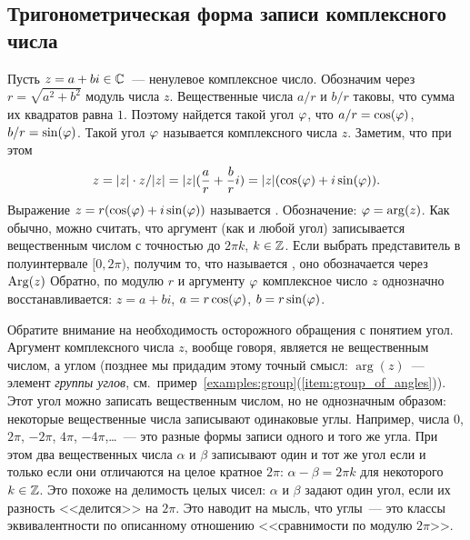 
\subsection{Тригонометрическая форма записи комплексного числа}


\begin{definition}\label{dfn:trigonometric_form}
Пусть $z=a+bi\in\mathbb C$~--- ненулевое комплексное число. Обозначим
через $r=\sqrt{a^2+b^2}$ модуль числа $z$. Вещественные
числа $a/r$ и
$b/r$ таковы, что сумма их квадратов равна $1$. Поэтому
найдется такой угол $\varphi$, что $a/r=\cos(\varphi)$,
$b/r=\sin(\varphi)$. Такой угол $\varphi$ называется
комплексного числа $z$. Заметим, что при этом
$$
z=|z|\cdot z/|z|=|z|(\frac{a}{r}+\frac{b}{r}i)=|z|(\cos(\varphi)+i\sin(\varphi)).
$$
Выражение $z=r(\cos(\varphi)+i\sin(\varphi))$ называется
. Обозначение: $\varphi=\arg(z)$. Как обычно,
можно считать, что аргумент (как и любой угол) записывается
вещественным числом с точностью до $2\pi k$, $k\in\mathbb Z$. Если выбрать
представитель в полуинтервале $[0,2\pi)$, получим то, что называется
, оно обозначается через $\operatorname{Arg}(z)$
Обратно, по
модулю $r$ и аргументу $\varphi$ комплексное число $z$ однозначно
восстанавливается: $z=a+bi$, $a=r\cos(\varphi)$, $b=r\sin(\varphi)$.
\end{definition}

{\small
Обратите внимание на необходимость осторожного обращения с понятием
угол. Аргумент комплексного числа $z$, вообще говоря, является не
вещественным числом, а углом (позднее мы придадим этому точный смысл:
$\arg(z)$~--- элемент {\it группы углов},
см.~пример~\ref{examples:group}(\ref{item:group_of_angles})). Этот угол можно
записать вещественным числом, но не однозначным образом: некоторые
вещественные числа записывают одинаковые углы. Например, числа $0$,
$2\pi$, $-2\pi$, $4\pi$, $-4\pi$,\dots ~--- это разные формы записи
одного и того же угла. При этом два вещественных числа $\alpha$ и
$\beta$ записывают один и тот же угол если и только если они
отличаются на целое кратное $2\pi$: $\alpha-\beta = 2\pi k$ для
некоторого $k\in\mathbb Z$. Это похоже на делимость целых чисел: $\alpha$
и $\beta$ задают один угол, если их разность <<делится>> на
$2\pi$. Это наводит на мысль, что углы~--- это классы эквивалентности
по описанному отношению <<сравнимости по модулю $2\pi$>>.
}

